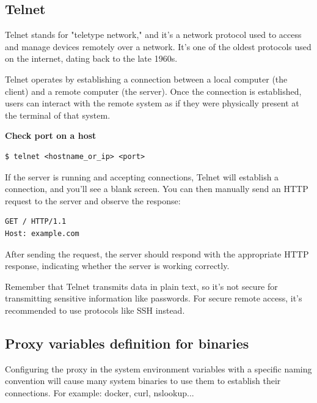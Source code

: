 \documentclass{article}
\newenvironment{blocktemplateIII}[1]{%
    \tcolorbox[beamer,%
    noparskip,breakable,
    ,colframe=Red,%
    colbacklower=LimeGreen!75!LightGreen,%
    title=#1]}%
    {\endtcolorbox}
\newenvironment{codetemplate}[1][]{%
  \mybasecolorbox[#1]
  \itshape
}{%
  \endmybasecolorbox
}
\begin{document}
\subsection{Telnet}

Telnet stands for "teletype network," and it's a network protocol used to access and manage devices remotely over a network. It's one of the oldest protocols used on the internet, dating back to the late 1960s.

Telnet operates by establishing a connection between a local computer (the client) and a remote computer (the server). Once the connection is established, users can interact with the remote system as if they were physically present at the terminal of that system.

\textbf{Check port on a host}
\begin{codetemplate}
\begin{verbatim}
$ telnet <hostname_or_ip> <port>
\end{verbatim}
\end{codetemplate}

If the server is running and accepting connections, Telnet will establish a connection, and you'll see a blank screen. You can then manually send an HTTP request to the server and observe the response:

\begin{codetemplate}
\begin{verbatim}
GET / HTTP/1.1
Host: example.com
\end{verbatim}
\end{codetemplate}

After sending the request, the server should respond with the appropriate HTTP response, indicating whether the server is working correctly.

\begin{blocktemplateIII}{WARNING}
Remember that Telnet transmits data in plain text, so it's not secure for transmitting sensitive information like passwords. For secure remote access, it's recommended to use protocols like SSH instead.
\end{blocktemplateIII}

\subsection{Proxy variables definition for binaries}
Configuring the proxy in the system environment variables with a specific naming convention will cause many system binaries to use them to establish their connections. For example: docker, curl, nslookup...
\end{document}
